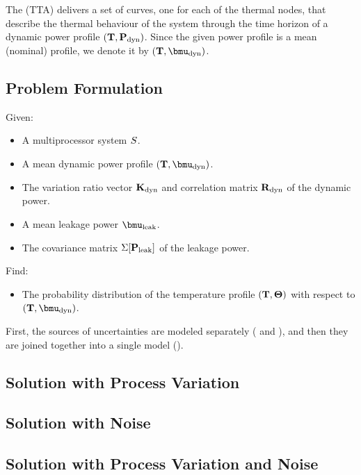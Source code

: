 The  (TTA) delivers a set of curves, one for each of the thermal nodes, that describe the thermal behaviour of the system through the time horizon of a dynamic power profile $(\mathbf{T}, \mathbf{P}_{\text{dyn}})$. Since the given power profile is a mean (nominal) profile, we denote it by $\mpprofile{\dyn}$.

\subsection{Problem Formulation}
Given:
\begin{itemize}
  \item A multiprocessor system $S$.
  \item A mean dynamic power profile $\mpprofile{\dyn}$.
  \item The variation ratio vector $\mathbf{K}_{\text{dyn}}$ and correlation matrix $\mathbf{R}_{\text{dyn}}$ of the dynamic power.
  \item A mean leakage power $\vmean{\leak}$.
  \item The covariance matrix $\Sigma[\mathbf{P}_{\text{leak}}]$ of the leakage power.
\end{itemize}

Find:
\begin{itemize}
  \item The probability distribution of the temperature profile $(\mathbf{T}, \mathbf{\Theta})$ with respect to $\mpprofile{\dyn}$.
\end{itemize}

First, the sources of uncertainties are modeled separately ( and ), and then they are joined together into a single model ().

\subsection{Solution with Process Variation} 


\subsection{Solution with Noise} 


\subsection{Solution with Process Variation and Noise} 

